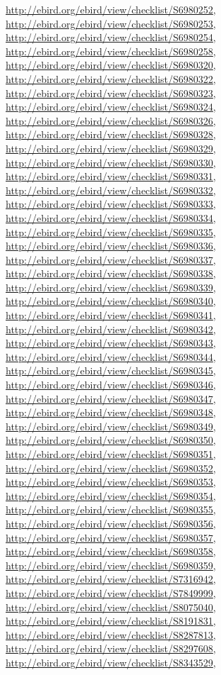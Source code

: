\documentclass[9pt, article]{memoir}
\begin{document}
\begin{multicols}{2}
\url{http://ebird.org/ebird/view/checklist/S6980252}, 
\url{http://ebird.org/ebird/view/checklist/S6980253}, 
\url{http://ebird.org/ebird/view/checklist/S6980254}, 
\url{http://ebird.org/ebird/view/checklist/S6980258}, 
\url{http://ebird.org/ebird/view/checklist/S6980320}, 
\url{http://ebird.org/ebird/view/checklist/S6980322}, 
\url{http://ebird.org/ebird/view/checklist/S6980323}, 
\url{http://ebird.org/ebird/view/checklist/S6980324}, 
\url{http://ebird.org/ebird/view/checklist/S6980326}, 
\url{http://ebird.org/ebird/view/checklist/S6980328}, 
\url{http://ebird.org/ebird/view/checklist/S6980329}, 
\url{http://ebird.org/ebird/view/checklist/S6980330}, 
\url{http://ebird.org/ebird/view/checklist/S6980331}, 
\url{http://ebird.org/ebird/view/checklist/S6980332}, 
\url{http://ebird.org/ebird/view/checklist/S6980333}, 
\url{http://ebird.org/ebird/view/checklist/S6980334}, 
\url{http://ebird.org/ebird/view/checklist/S6980335}, 
\url{http://ebird.org/ebird/view/checklist/S6980336}, 
\url{http://ebird.org/ebird/view/checklist/S6980337}, 
\url{http://ebird.org/ebird/view/checklist/S6980338}, 
\url{http://ebird.org/ebird/view/checklist/S6980339}, 
\url{http://ebird.org/ebird/view/checklist/S6980340}, 
\url{http://ebird.org/ebird/view/checklist/S6980341}, 
\url{http://ebird.org/ebird/view/checklist/S6980342}, 
\url{http://ebird.org/ebird/view/checklist/S6980343}, 
\url{http://ebird.org/ebird/view/checklist/S6980344}, 
\url{http://ebird.org/ebird/view/checklist/S6980345}, 
\url{http://ebird.org/ebird/view/checklist/S6980346}, 
\url{http://ebird.org/ebird/view/checklist/S6980347}, 
\url{http://ebird.org/ebird/view/checklist/S6980348}, 
\url{http://ebird.org/ebird/view/checklist/S6980349}, 
\url{http://ebird.org/ebird/view/checklist/S6980350}, 
\url{http://ebird.org/ebird/view/checklist/S6980351}, 
\url{http://ebird.org/ebird/view/checklist/S6980352}, 
\url{http://ebird.org/ebird/view/checklist/S6980353}, 
\url{http://ebird.org/ebird/view/checklist/S6980354}, 
\url{http://ebird.org/ebird/view/checklist/S6980355}, 
\url{http://ebird.org/ebird/view/checklist/S6980356}, 
\url{http://ebird.org/ebird/view/checklist/S6980357}, 
\url{http://ebird.org/ebird/view/checklist/S6980358}, 
\url{http://ebird.org/ebird/view/checklist/S6980359}, 
\url{http://ebird.org/ebird/view/checklist/S7316942}, 
\url{http://ebird.org/ebird/view/checklist/S7849999}, 
\url{http://ebird.org/ebird/view/checklist/S8075040}, 
\url{http://ebird.org/ebird/view/checklist/S8191831}, 
\url{http://ebird.org/ebird/view/checklist/S8287813}, 
\url{http://ebird.org/ebird/view/checklist/S8297608}, 
\url{http://ebird.org/ebird/view/checklist/S8343529}, 

\end{multicols}
\end{document}

